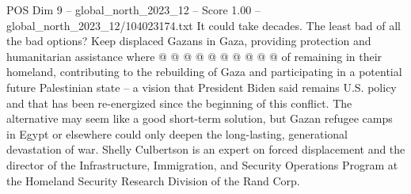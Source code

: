 \begin{textsample}{POS Dim 9 – global\_north\_2023\_12 – Score 1.00 – global\_north\_2023\_12/104023174.txt}
It could take decades.
The least bad of all the bad options?
Keep displaced Gazans in Gaza, providing protection and humanitarian assistance where @ @ @ @ @ @ @ @ @ @ of remaining in their homeland, contributing to the rebuilding of Gaza and participating in a potential future Palestinian state -- a vision that President Biden said remains U.S. policy and that has been re-energized since the beginning of this conflict.
The alternative may seem like a good short-term solution, but Gazan refugee camps in Egypt or elsewhere could only deepen the long-lasting, generational devastation of war.
Shelly Culbertson is an expert on forced displacement and the director of the Infrastructure, Immigration, and Security Operations Program at the Homeland Security Research Division of the Rand Corp.

\end{textsample}
